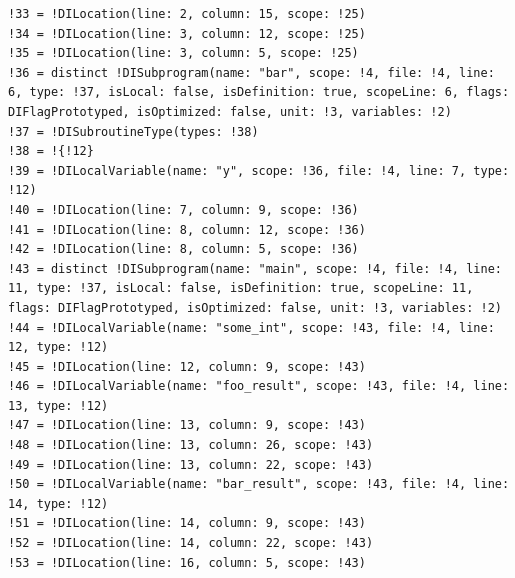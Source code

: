 \documentclass[12pt, twoside]{fithesis2}
\renewcommand{\_}{\leavevmode \kern0.07em\vbox{\hrule width0.4em}}
\begin{document}
\begin{verbatim}
!33 = !DILocation(line: 2, column: 15, scope: !25)
!34 = !DILocation(line: 3, column: 12, scope: !25)
!35 = !DILocation(line: 3, column: 5, scope: !25)
!36 = distinct !DISubprogram(name: "bar", scope: !4, file: !4, line: 6, type: !37, isLocal: false, isDefinition: true, scopeLine: 6, flags: DIFlagPrototyped, isOptimized: false, unit: !3, variables: !2)
!37 = !DISubroutineType(types: !38)
!38 = !{!12}
!39 = !DILocalVariable(name: "y", scope: !36, file: !4, line: 7, type: !12)
!40 = !DILocation(line: 7, column: 9, scope: !36)
!41 = !DILocation(line: 8, column: 12, scope: !36)
!42 = !DILocation(line: 8, column: 5, scope: !36)
!43 = distinct !DISubprogram(name: "main", scope: !4, file: !4, line: 11, type: !37, isLocal: false, isDefinition: true, scopeLine: 11, flags: DIFlagPrototyped, isOptimized: false, unit: !3, variables: !2)
!44 = !DILocalVariable(name: "some_int", scope: !43, file: !4, line: 12, type: !12)
!45 = !DILocation(line: 12, column: 9, scope: !43)
!46 = !DILocalVariable(name: "foo_result", scope: !43, file: !4, line: 13, type: !12)
!47 = !DILocation(line: 13, column: 9, scope: !43)
!48 = !DILocation(line: 13, column: 26, scope: !43)
!49 = !DILocation(line: 13, column: 22, scope: !43)
!50 = !DILocalVariable(name: "bar_result", scope: !43, file: !4, line: 14, type: !12)
!51 = !DILocation(line: 14, column: 9, scope: !43)
!52 = !DILocation(line: 14, column: 22, scope: !43)
!53 = !DILocation(line: 16, column: 5, scope: !43)
\end{verbatim}

\end{document}
